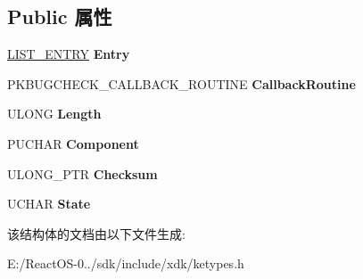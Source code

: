 \subsection*{Public 属性}
\begin{DoxyCompactItemize}
\item 
\mbox{\label{struct___k_b_u_g_c_h_e_c_k___c_a_l_l_b_a_c_k___r_e_c_o_r_d_a3c944a7729efe324ad8922f0052afeab}} 
\hyperlink{struct___l_i_s_t___e_n_t_r_y}{L\+I\+S\+T\+\_\+\+E\+N\+T\+RY} {\bfseries Entry}
\item 
\mbox{\label{struct___k_b_u_g_c_h_e_c_k___c_a_l_l_b_a_c_k___r_e_c_o_r_d_ac8e5063fa047ca73bfa968c9d704415e}} 
P\+K\+B\+U\+G\+C\+H\+E\+C\+K\+\_\+\+C\+A\+L\+L\+B\+A\+C\+K\+\_\+\+R\+O\+U\+T\+I\+NE {\bfseries Callback\+Routine}
\item 
\mbox{\label{struct___k_b_u_g_c_h_e_c_k___c_a_l_l_b_a_c_k___r_e_c_o_r_d_a71aa07d9689002c220f03e7fc87374b2}} 
U\+L\+O\+NG {\bfseries Length}
\item 
\mbox{\label{struct___k_b_u_g_c_h_e_c_k___c_a_l_l_b_a_c_k___r_e_c_o_r_d_a1cbca6d976f07f0130d329f74dfcce8d}} 
P\+U\+C\+H\+AR {\bfseries Component}
\item 
\mbox{\label{struct___k_b_u_g_c_h_e_c_k___c_a_l_l_b_a_c_k___r_e_c_o_r_d_adb5c1a0f6094f4a2429b2d27264f1d53}} 
U\+L\+O\+N\+G\+\_\+\+P\+TR {\bfseries Checksum}
\item 
\mbox{\label{struct___k_b_u_g_c_h_e_c_k___c_a_l_l_b_a_c_k___r_e_c_o_r_d_ae1c5bb2ba2da8285cc6b8bbbb7215a13}} 
U\+C\+H\+AR {\bfseries State}
\end{DoxyCompactItemize}


该结构体的文档由以下文件生成\+:\begin{DoxyCompactItemize}
\item 
E\+:/\+React\+O\+S-\/0../sdk/include/xdk/ketypes.\+h\end{DoxyCompactItemize}

